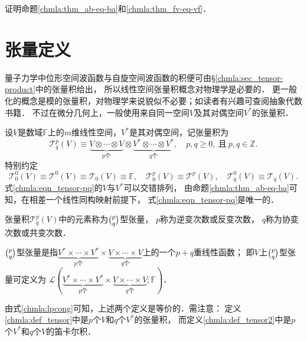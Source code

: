 \begin{exercise}
	证明命题\ref{chmla:thm_ab-eq-ba}和\ref{chmla:thm_fv-eq-vf}．
\end{exercise}


\section{张量定义}\label{chmla:sec_tensor}

量子力学中位形空间波函数与自旋空间波函数的{\kaishu 积}便可由\S\ref{chmla:sec_tensor-product}中的张量积给出，
所以线性空间张量积概念对物理学是必要的．
更一般化的概念是模的张量积，对物理学来说貌似不必要；如读者有兴趣可查阅抽象代数书籍．
不过在微分几何上，一般使用来自同一空间$V$及其对偶空间$V^*$的张量积．

设$V$是数域$\mathbb{F}$上的$m$维线性空间，$V^*$是其对偶空间，记张量积为
\begin{equation}\label{chmla:eqn_tensor-pq}
    \mathcal{T}^p_q(V) \equiv \underbrace{V\otimes \cdots \otimes V}_{p\text{个}}
    \otimes \underbrace{V^*\otimes \cdots \otimes V^*}_{q\text{个}},
    \quad p,q \geqslant 0 , 
    \  {\text{且}} \  p,q \in \mathbb{Z} .
\end{equation}
特别约定
\begin{equation}
    \mathcal{T}^0_0(V) \equiv \mathcal{T}^0(V) \equiv \mathcal{T}_0(V) \equiv \mathbb{F},
    \quad \mathcal{T}^p_0(V) \equiv \mathcal{T}^p(V),
    \quad \mathcal{T}^0_q(V) \equiv \mathcal{T}_q(V).
\end{equation}
式\eqref{chmla:eqn_tensor-pq}的$V$与$V^*$可以交错排列，
由命题\ref{chmla:thm_ab-eq-ba}可知，在相差一个线性同构映射前提下，
式\eqref{chmla:eqn_tensor-pq}是唯一的．


\begin{definition}\label{chmla:def_tensor}
    张量积$\mathcal{T}^p_q(V)$中的元素称为$\binom{p}{q}${\heiti 型张量}，
    $p$称为{\heiti 逆变次数}或反变次数，
    $q$称为{\heiti 协变次数}或共变次数．
\end{definition}

\begin{definition}\label{chmla:def_tensor2}
    $\binom{p}{q}${\heiti 型张量}是指$\underbrace{V^* \times \cdots \times V^*}_{p\text{个}}
    \times \underbrace{V\times \cdots \times V}_{q\text{个}}$上的一个$p+q$重线性函数；
    即$V$上$\binom{p}{q}$型张量可定义为
    $\mathscr{L}(\underbrace{V^* \times \cdots \times V^*}_{p\text{个}}
    \times \underbrace{V\times \cdots \times V}_{q\text{个}};\mathbb{F})$．
\end{definition}
由式\eqref{chmla:lpcong}可知，上述两个定义是等价的．需注意：
定义\ref{chmla:def_tensor}中是$p$个$V$和$q$个$V^*$的张量积，
而定义\ref{chmla:def_tensor2}中是$p$个$V^*$和$q$个$V$的笛卡尔积．

